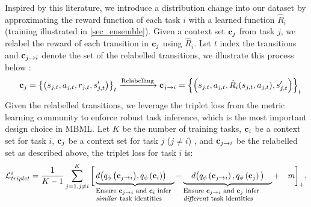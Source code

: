 Inspired by this literature, we introduce a distribution change into our dataset by approximating the reward function of each task $i$ with a learned function $\hat{R}_i$ (training illustrated in \autoref{sec_ensemble}). Given a context set ${\bf c}_j$ from task $j$, we relabel the reward of each transition in ${\bf c}_j$ using $\hat{R}_i$. Let $t$ index the transitions and ${\bf c}_{j\rightarrow{i}}$ denote the set of the relabelled transitions, we illustrate this process below :
\begin{equation}\label{eq_relabel}
    \quad {\bf c}_{j}=\left\{ \left(s_{j, t}, a_{j, t}, r_{j, t}, s_{j, t}^{\prime}\right) \right\}_t   \xrightarrow{\text{Relabelling}} {\bf c}_{j\rightarrow{i}} = \left\{ \left(s_{j, t}, a_{j, t}, \hat{R}_i(s_{j, t}, a_{j, t}), s_{j, t}^{\prime} \right) \right\}_t
\end{equation}
Given the relabelled transitions, we leverage the triplet loss from the metric learning community \cite{hermans2017defense} to enforce robust task inference, which is the most important design choice in MBML. Let $K$ be the number of training tasks, ${\bf c}_i$ be a context set for task $i$, ${\bf c}_j$ be
a context set for task $j$ ($j \neq i$)
, and ${\bf c}_{j\rightarrow{i}}$ be the relabelled set as described above, the triplet loss for task $i$ is:
\begin{equation}\label{eq_triplet_task_i}
    \mathcal{L}^i_{triplet} = \frac{1}{K-1} \sum_{j=1, j \neq i }^{K} \bigg[\explain{d \big(q_{\phi}\left({\bf c}_{j\rightarrow{i}}\big), q_{\phi}\left({\bf c}_{i}\right)\right) \quad}{Ensure ${\bf c}_{j\rightarrow{i}}$ and ${\bf c}_{i}$ infer \textit{similar} task identities \quad}
        - \explain{ \quad d\big(q_{\phi}\left({\bf c}_{j\rightarrow{i}}\right), q_{\phi}\left({\bf c}_{j}\right)\big) \quad}{Ensure ${\bf c}_{j\rightarrow{i}}$ and ${\bf c}_{j}$ infer \textit{different} task identities} + \quad m\bigg]_{+},
\end{equation}

